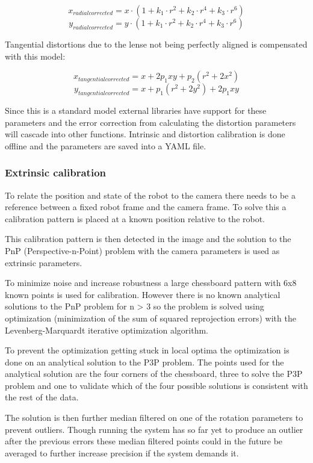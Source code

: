 \[x_{radialcorrected} = x\cdot (1+k_1\cdot r^2 + k_2\cdot r^4 + k_3\cdot r^6)\]
\[y_{radialcorrected} = y\cdot (1+k_1\cdot r^2 + k_2\cdot r^4 + k_3\cdot r^6)\]

Tangential distortions due to the lense not being perfectly aligned is compensated with this model:

\[x_{tangentialcorrected} = x + 2p_1xy+p_2(r^2+2x^2)\]
\[y_{tangentialcorrected} = x + p_1(r^2+2y^2)+2p_1xy\]

Since this is a standard model external libraries have support for these parameters and the error correction from calculating the distortion parameters will cascade into other functions. Intrinsic and distortion calibration is done offline and the parameters are saved into a YAML file.

\subsubsection{Extrinsic calibration}
To relate the position and state of the robot to the camera there needs to be a reference between a fixed robot frame and the camera frame. To solve this a calibration pattern is placed at a known position relative to the robot.

This calibration pattern is then detected in the image and the solution to the PnP (Perspective-n-Point) problem with the camera parameters is used as extrinsic parameters.

To minimize noise and increase robustness a large chessboard pattern with 6x8 known points is used for calibration. However there is no known analytical solutions to the PnP problem for n > 3 so the problem is solved using optimization (minimization of the sum of squared reprojection errors) with the Levenberg-Marquardt iterative optimization algorithm.

To prevent the optimization getting stuck in local optima the optimization is done on an analytical solution to the P3P problem. The points used for the analytical solution are the four corners of the chessboard, three to solve the P3P problem and one to validate which of the four possible solutions is consistent with the rest of the data.

The solution is then further median filtered on one of the rotation parameters to prevent outliers. Though running the system has so far yet to produce an outlier after the previous errors these median filtered points could in the future be averaged to further increase precision if the system demands it.

